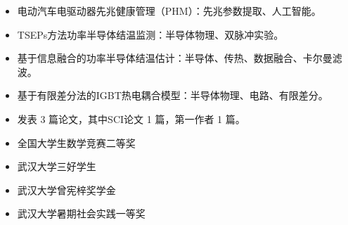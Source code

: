 \documentclass[zh]{resume}
\begin{document}
\begin{itemize}
  \item 电动汽车电驱动器先兆健康管理（PHM）：先兆参数提取、人工智能。
  \item TSEPs方法功率半导体结温监测：半导体物理、双脉冲实验。
  \item 基于信息融合的功率半导体结温估计：半导体、传热、数据融合、卡尔曼滤波。
  \item 基于有限差分法的IGBT热电耦合模型：半导体物理、电路、有限差分。
  \item 发表 3 篇论文，其中SCI论文 1 篇，第一作者 1 篇。
\end{itemize}

\begin{itemize}
  \item 全国大学生数学竞赛二等奖
  \item 武汉大学三好学生
  \item 武汉大学曾宪梓奖学金
  \item 武汉大学暑期社会实践一等奖
\end{itemize}


\end{document}
